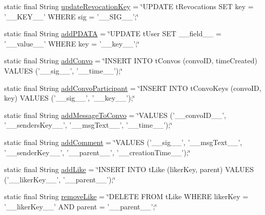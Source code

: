 \begin{DoxyCompactItemize}
\item 
static final String \hyperlink{classballmerpeak_1_1turtlenet_1_1server_1_1DBStrings_a39d82ab9d47622f3d106772a81171a1d}{update\-Revocation\-Key} = \char`\"{}U\-P\-D\-A\-T\-E t\-Revocations S\-E\-T key = '\-\_\-\-\_\-\-K\-E\-Y\-\_\-\-\_\-' W\-H\-E\-R\-E sig = '\-\_\-\-\_\-\-S\-I\-G\-\_\-\-\_\-';\char`\"{}
\item 
static final String \hyperlink{classballmerpeak_1_1turtlenet_1_1server_1_1DBStrings_aac23d2b9eecb5d6088f8bb5058370c7b}{add\-P\-D\-A\-T\-A} = \char`\"{}U\-P\-D\-A\-T\-E t\-User S\-E\-T \-\_\-\-\_\-field\-\_\-\-\_\- = '\-\_\-\-\_\-value\-\_\-\-\_\-' W\-H\-E\-R\-E key = '\-\_\-\-\_\-key\-\_\-\-\_\-';\char`\"{}
\item 
static final String \hyperlink{classballmerpeak_1_1turtlenet_1_1server_1_1DBStrings_ac332d75426a3fc552c1492ca1c14701c}{add\-Convo} = \char`\"{}I\-N\-S\-E\-R\-T I\-N\-T\-O t\-Convos (convo\-I\-D, time\-Created) V\-A\-L\-U\-E\-S ('\-\_\-\-\_\-sig\-\_\-\-\_\-', '\-\_\-\-\_\-time\-\_\-\-\_\-');\char`\"{}
\item 
static final String \hyperlink{classballmerpeak_1_1turtlenet_1_1server_1_1DBStrings_a2ef3257d6674eeb1d1eb0db4427eee3f}{add\-Convo\-Participant} = \char`\"{}I\-N\-S\-E\-R\-T I\-N\-T\-O t\-Convo\-Keys (convo\-I\-D, key) V\-A\-L\-U\-E\-S ('\-\_\-\-\_\-sig\-\_\-\-\_\-', '\-\_\-\-\_\-key\-\_\-\-\_\-');\char`\"{}
\item 
static final String \hyperlink{classballmerpeak_1_1turtlenet_1_1server_1_1DBStrings_a45dac2349c3f3f754513df6f87cc3b50}{add\-Message\-To\-Convo} = \char`\"{}V\-A\-L\-U\-E\-S ('\-\_\-\-\_\-convo\-I\-D\-\_\-\-\_\-', '\-\_\-\-\_\-senders\-Key\-\_\-\-\_\-', '\-\_\-\-\_\-msg\-Text\-\_\-\-\_\-', '\-\_\-\-\_\-time\-\_\-\-\_\-');\char`\"{}
\item 
static final String \hyperlink{classballmerpeak_1_1turtlenet_1_1server_1_1DBStrings_a87d52ca49fb4861212ad5e9319ca8707}{add\-Comment} = \char`\"{}V\-A\-L\-U\-E\-S ('\-\_\-\-\_\-sig\-\_\-\-\_\-', '\-\_\-\-\_\-msg\-Text\-\_\-\-\_\-', '\-\_\-\-\_\-sender\-Key\-\_\-\-\_\-', '\-\_\-\-\_\-parent\-\_\-\-\_\-', '\-\_\-\-\_\-creation\-Time\-\_\-\-\_\-');\char`\"{}
\item 
static final String \hyperlink{classballmerpeak_1_1turtlenet_1_1server_1_1DBStrings_a2a78b8bf2571d76c753619719f6f5aac}{add\-Like} = \char`\"{}I\-N\-S\-E\-R\-T I\-N\-T\-O t\-Like (liker\-Key, parent) V\-A\-L\-U\-E\-S ('\-\_\-\-\_\-liker\-Key\-\_\-\-\_\-', '\-\_\-\-\_\-parent\-\_\-\-\_\-');\char`\"{}
\item 
static final String \hyperlink{classballmerpeak_1_1turtlenet_1_1server_1_1DBStrings_a17b087b58c02d5e260242f71add2c9ca}{remove\-Like} = \char`\"{}D\-E\-L\-E\-T\-E F\-R\-O\-M t\-Like W\-H\-E\-R\-E liker\-Key = '\-\_\-\-\_\-liker\-Key\-\_\-\-\_\-' A\-N\-D parent = '\-\_\-\-\_\-parent\-\_\-\-\_\-';\char`\"{}

\end{DoxyCompactItemize}
